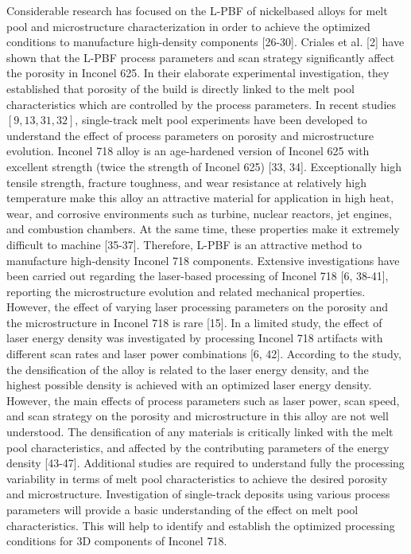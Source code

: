\documentclass[10pt]{article}
\begin{document}
Considerable research has focused on the L-PBF of nickelbased alloys for melt pool and microstructure characterization in order to achieve the optimized conditions to manufacture high-density components [26-30]. Criales et al. [2] have shown that the L-PBF process parameters and scan strategy significantly affect the porosity in Inconel 625. In their elaborate experimental investigation, they established that porosity of the build is directly linked to the melt pool characteristics which are controlled by the process parameters. In recent studies $[9,13,31,32]$, single-track melt pool experiments have been developed to understand the effect of process parameters on porosity and microstructure evolution. Inconel 718 alloy is an age-hardened version of Inconel 625 with excellent strength (twice the strength of Inconel 625) [33, 34]. Exceptionally high tensile strength, fracture toughness, and wear resistance at relatively high temperature make this alloy an attractive material for application in high heat, wear, and corrosive environments such as turbine, nuclear reactors, jet engines, and combustion chambers. At the same time, these properties make it extremely difficult to machine [35-37]. Therefore, L-PBF is an attractive method to manufacture high-density Inconel 718 components. Extensive investigations have been carried out regarding the laser-based processing of Inconel 718 [6, 38-41], reporting the microstructure evolution and related mechanical properties. However, the effect of varying laser processing parameters on the porosity and the microstructure in Inconel 718 is rare [15]. In a limited study, the effect of laser energy density was investigated by processing Inconel 718 artifacts with different scan rates and laser power combinations [6, 42]. According to the study, the densification of the alloy is related to the laser energy density, and the highest possible density is achieved with an optimized laser energy density. However, the main effects of process parameters such as laser power, scan speed, and scan strategy on the porosity and microstructure in this alloy are not well understood. The densification of any materials is critically linked with the melt pool characteristics, and affected by the contributing parameters of the energy density [43-47]. Additional studies are required to understand fully the processing variability in terms of melt pool characteristics to achieve the desired porosity and microstructure. Investigation of single-track deposits using various process parameters will provide a basic understanding of the effect on melt pool characteristics. This will help to identify and establish the optimized processing conditions for 3D components of Inconel 718.
\end{document}
